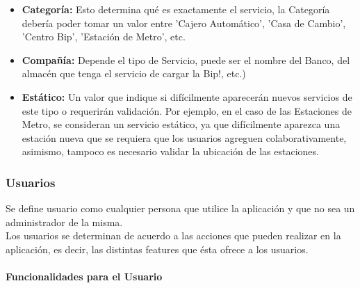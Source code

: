 \documentclass[10pt,letterpaper]{article}
\begin{document}
\begin{itemize}
 \item \textbf{Categoría:} Esto determina qué es exactamente el servicio, la Categoría debería poder tomar un valor entre 'Cajero Automático', 'Casa de Cambio', 'Centro Bip', 'Estación de Metro', etc.\\

 \item \textbf{Compañía:} Depende el tipo de Servicio, puede ser el nombre del Banco, del almacén que tenga el servicio de cargar la Bip!, etc.)\\

 \item \textbf{Estático:} Un valor que indique si difícilmente aparecerán nuevos servicios de este tipo o requerirán validación. Por ejemplo, en el caso de las Estaciones de Metro, se consideran un servicio estático, ya que difícilmente aparezca una estación nueva que se requiera que los usuarios agreguen colaborativamente, asimismo, tampoco es necesario validar la ubicación de las estaciones.\\
\end{itemize}

\subsubsection{Usuarios}

Se define usuario como cualquier persona que utilice la aplicación y que no sea un administrador de la misma.\\

Los usuarios se determinan de acuerdo a las acciones que pueden realizar en la aplicación, es decir, las distintas features que ésta ofrece a los usuarios.\\

\paragraph{Funcionalidades para el Usuario}
\end{document}
